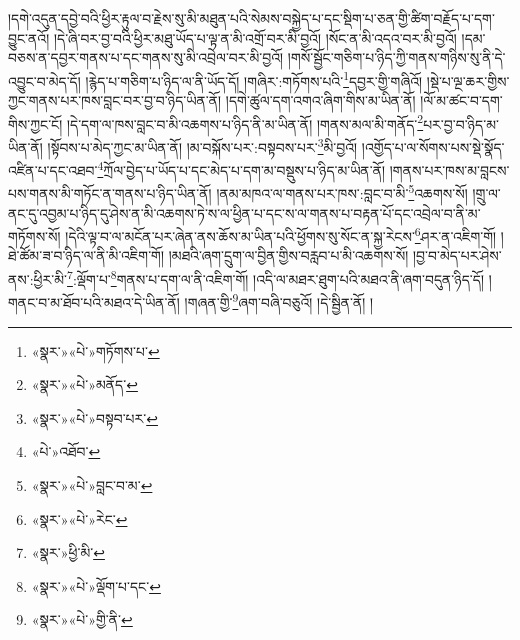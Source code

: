 །དགེ་འདུན་དབྱེ་བའི་ཕྱིར་རྟུལ་བ་རྗེས་སུ་མི་མཐུན་པའི་སེམས་བསྐྱེད་པ་དང་སྡིག་པ་ཅན་གྱི་ཚིག་བརྗོད་པ་དག་བྱུང་ནའོ། །དེ་ཞི་བར་བྱ་བའི་ཕྱིར་མཐུ་ཡོད་པ་ལྟ་ན་མི་འགྲོ་བར་མི་བྱའོ། །སོང་ན་མི་འདའ་བར་མི་བྱའོ། །དམ་བཅས་ན་དབྱར་གནས་པ་དང་གནས་སུ་མི་འབྲེལ་བར་མི་བྱའོ། །གསོ་སྦྱོང་གཅིག་པ་ཉིད་ཀྱི་གནས་གཉིས་སུ་ནི་དེ་འབྱུང་བ་མེད་དོ། །རྙེད་པ་གཅིག་པ་ཉིད་ལ་ནི་ཡོད་དོ། །གཞིར་:གཏོགས་པའི་\footnote{«སྣར་»«པེ་»གཏོགས་པ་}དབྱར་གྱི་གཞིའོ། །སྡེ་པ་ལྔ་ཆར་གྱིས་ཀྱང་གནས་པར་ཁས་བླང་བར་བྱ་བ་ཉིད་ཡིན་ནོ། །དགེ་ཚུལ་དག་འགའ་ཞིག་གིས་མ་ཡིན་ནོ། །ལོ་མ་ཚང་བ་དག་གིས་ཀྱང་ངོ། །དེ་དག་ལ་ཁས་བླང་བ་མི་འཆགས་པ་ཉིད་ནི་མ་ཡིན་ནོ། །གནས་མལ་མི་གནོད་\footnote{«སྣར་»«པེ་»མནོད་}པར་བྱ་བ་ཉིད་མ་ཡིན་ནོ། །སྟོབས་པ་མེད་ཀྱང་མ་ཡིན་ནོ། །མ་བསྐོས་པར་:བསྟབས་པར་\footnote{«སྣར་»«པེ་»བསྟབ་པར་}མི་བྱའོ། །འགྱོད་པ་ལ་སོགས་པས་སྡེ་སྣོད་འཛིན་པ་དང་འཐབ་\footnote{«པེ་»འཐོབ་}ཀྲོལ་བྱེད་པ་ཡོད་པ་དང་མེད་པ་དག་མ་བསྡུས་པ་ཉིད་མ་ཡིན་ནོ། །གནས་པར་ཁས་མ་བླངས་པས་གནས་མི་གཏོང་ན་གནས་པ་ཉིད་ཡིན་ནོ། །ནམ་མཁའ་ལ་གནས་པར་ཁས་:བླང་བ་མི་\footnote{«སྣར་»«པེ་»བླང་བ་མ་}འཆགས་སོ། །གྲུ་ལ་ནང་དུ་འབྱམ་པ་ཉིད་དུ་ཤེས་ན་མི་འཆགས་ཏེ་ས་ལ་ཕྱིན་པ་དང་ས་ལ་གནས་པ་བརྟན་པོ་དང་འབྲེལ་བ་ནི་མ་གཏོགས་སོ། །དེའི་ལྟ་བ་ལ་མངོན་པར་ཞེན་ནས་ཆོས་མ་ཡིན་པའི་ཕྱོགས་སུ་སོང་ན་སྐྱ་རེངས་\footnote{«སྣར་»«པེ་»རེང་}ཤར་ན་འཇིག་གོ། །ཐེ་ཚོམ་ཟ་བ་ཉིད་ལ་ནི་མི་འཇིག་གོ། །མཐའི་ཞག་དྲུག་ལ་བྱིན་གྱིས་བརླབ་པ་མི་འཆགས་སོ། །བྱ་བ་མེད་པར་ཤེས་ནས་:ཕྱིར་མི་\footnote{«སྣར་»ཕྱི་མི་}:ལྡོག་པ་\footnote{«སྣར་»«པེ་»ལྡོག་པ་དང་}གནས་པ་དག་ལ་ནི་འཇིག་གོ། །འདི་ལ་མཐར་ཐུག་པའི་མཐའ་ནི་ཞག་བདུན་ཉིད་དོ། །གནང་བ་མ་ཐོབ་པའི་མཐའ་དེ་ཡིན་ནོ། །གཞན་གྱི་\footnote{«སྣར་»«པེ་»གྱི་ནི་}ཞག་བཞི་བཅུའོ། །དེ་སྦྱིན་ནོ། །
